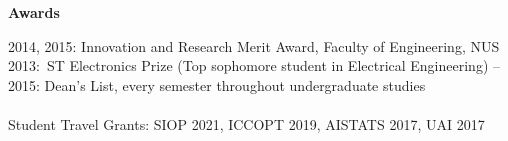 \documentclass[11pt]{article}
\begin{document}
\begin{minipage}[t]{0.18\textwidth}
\textbf{Awards}
\end{minipage}
\begin{minipage}[t]{0.8\textwidth}
2014, 2015: Innovation and Research Merit Award, Faculty of Engineering, NUS \newline\newline
2013:\ ST Electronics Prize (Top sophomore student in Electrical Engineering)\newline{} -- 2015: Dean's List, every semester throughout undergraduate studies\\\\ 
Student Travel Grants: SIOP 2021, ICCOPT 2019, AISTATS 2017, UAI 2017  \newline\newline
\end{minipage} 
\end{document}
